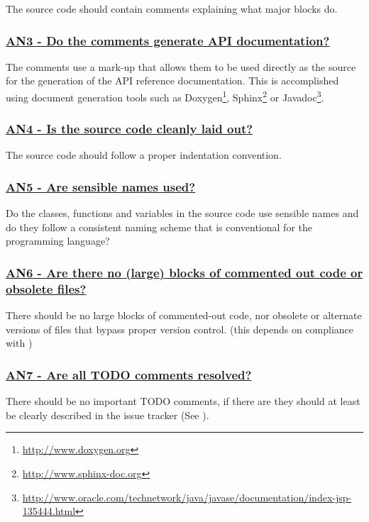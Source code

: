 \documentclass[a4paper,11pt]{article}
\newcommand{\criterion}[2]{\subsubsection*{\underline{#1 - #2}}\label{id:#1}}
\newcommand\CheckTable{%
  \begin{tabular}{ccccc}
    No & Minimal & Adequate & Good & Perfect \\
    0 & 1 & 2 & 3 & 4 \\
    \hline
    $\square$ & $\square$ & $\square$ & $\square$ & $\square$ \\
  \end{tabular}%
}
\newcommand{\refcrit}[1]{%
 \framebox[1.1\width]{\hyperref[id:#1]{#1}}
}
\begin{document}
The source code should contain comments explaining what major blocks do.


\newcommand{\anThreeID}{AN3}
\newcommand{\anThreeText}{Do the comments generate API documentation?}
\criterion{\anThreeID}{\anThreeText}

The comments use a mark-up that allows them to be used directly as the
source for the generation of the API reference documentation. This is
%
%
%
accomplished using document generation tools such as Doxygen\footnote{\url{http://www.doxygen.org}}, Sphinx\footnote{\url{http://www.sphinx-doc.org}} or
Javadoc\footnote{\url{http://www.oracle.com/technetwork/java/javase/documentation/index-jsp-135444.html}}.


\newcommand{\anFourID}{AN4}
\newcommand{\anFourText}{Is the source code cleanly laid out?}
\criterion{\anFourID}{\anFourText}

The source code should follow a proper indentation convention. 


\newcommand{\anFiveID}{AN5}
\newcommand{\anFiveText}{Are sensible names used?}
\criterion{\anFiveID}{\anFiveText}

Do the classes, functions and variables in the source code use sensible names
and do they follow a consistent naming scheme that is conventional for the
programming language?


\newcommand{\anSixID}{AN6}
\newcommand{\anSixText}{Are there no (large) blocks of commented out code or obsolete files?}
\criterion{\anSixID}{\anSixText}

There should be no large blocks of commented-out code, nor obsolete or
alternate versions of files that bypass proper version control.
(this depends on compliance with \refcrit{AC1})


\newcommand{\anSevenID}{AN7}
\newcommand{\anSevenText}{Are all TODO comments resolved?}
\criterion{\anSevenID}{\anSevenText}

There should be no important TODO comments, if there are they should at least be
clearly described in the issue tracker (See \refcrit{SP2}).
\end{document}
